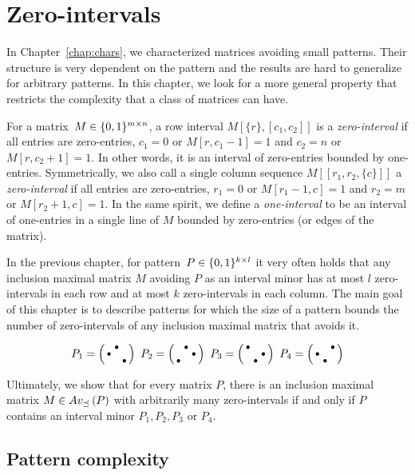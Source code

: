 \chapter{Zero-intervals}
\label{intervals}
In Chapter~\ref{chap:chars}, we characterized matrices avoiding small patterns. Their structure is very dependent on the pattern and the results are hard to generalize for arbitrary patterns. In this chapter, we look for a more general property that restricts the complexity that a class of matrices can have.

\begin{defn}
For a matrix~$M\in\{0,1\}^{m\times n}$, a row interval $M[\{r\},[c_1,c_2]]$ is a \emph{zero-interval} if all entries are zero-entries, $c_1=0$ or $M[r,c_1-1]=1$ and $c_2=n$ or $M[r,c_2+1]=1$. In other words, it is an interval of zero-entries bounded by one-entries. Symmetrically, we also call a single column sequence $M[[r_1,r_2,\{c\}]]$ a \emph{zero-interval} if all entries are zero-entries, $r_1=0$ or $M[r_1-1,c]=1$ and $r_2=m$ or $M[r_2+1,c]=1$. In the same spirit, we define a \emph{one-interval} to be an interval of one-entries in a single line of $M$ bounded by zero-entries (or edges of the matrix).
\end{defn}

In the previous chapter, for pattern~$P\in\{0,1\}^{k\times l}$ it very often holds that any inclusion maximal matrix $M$ avoiding $P$ as an interval minor has at most $l$ zero-intervals in each row and at most $k$ zero-intervals in each column. The main goal of this chapter is to describe patterns for which the size of a pattern bounds the number of zero-intervals of any inclusion maximal matrix that avoids it.

$$P_1=\left(\begin{smallmatrix} &\bullet& \\\bullet& & \\ & &\bullet\end{smallmatrix}\right)\ P_2=\left(\begin{smallmatrix} &\bullet& \\ & &\bullet\\\bullet& & \end{smallmatrix}\right)\ P_3=\left(\begin{smallmatrix}\bullet& & \\ & &\bullet\\ &\bullet& \end{smallmatrix}\right)\ P_4=\left(\begin{smallmatrix} & &\bullet\\\bullet& & \\ &\bullet& \end{smallmatrix}\right)$$

Ultimately, we show that for every matrix $P$, there is an inclusion maximal matrix $M\in Av_{\preceq}\left(P\right)$ with arbitrarily many zero-intervals if and only if $P$ contains an interval minor $P_1,P_2,P_3$ or $P_4$.

\section{Pattern complexity}


